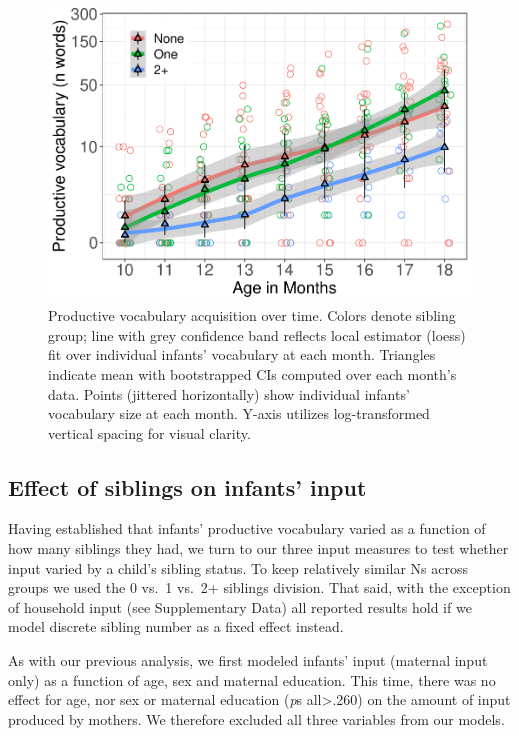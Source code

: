 \documentclass[
  english,
  man,floatsintext]{apa6}
\begin{document}
\begin{figure}
\centering
\includegraphics{SiblingsStudyText_files/figure-latex/Figure-SibGroup-1.pdf}
\caption{\label{fig:Figure-SibGroup}Productive vocabulary acquisition over time. Colors denote sibling group; line with grey confidence band reflects local estimator (loess) fit over individual infants' vocabulary at each month. Triangles indicate mean with bootstrapped CIs computed over each month's data. Points (jittered horizontally) show individual infants' vocabulary size at each month. Y-axis utilizes log-transformed vertical spacing for visual clarity.}
\end{figure}

\hypertarget{effect-of-siblings-on-infants-input}{%
\subsection{Effect of siblings on infants' input}\label{effect-of-siblings-on-infants-input}}

Having established that infants' productive vocabulary varied as a function of how many siblings they had, we turn to our three input measures to test whether input varied by a child's sibling status. To keep relatively similar Ns across groups we used the 0 vs.~1 vs.~2+ siblings division. That said, with the exception of household input (see Supplementary Data) all reported results hold if we model discrete sibling number as a fixed effect instead.

As with our previous analysis, we first modeled infants' input (maternal input only) as a function of age, sex and maternal education. This time, there was no effect for age, nor sex or maternal education (\emph{p}s all\textgreater.260) on the amount of input produced by mothers. We therefore excluded all three variables from our models.
\end{document}
